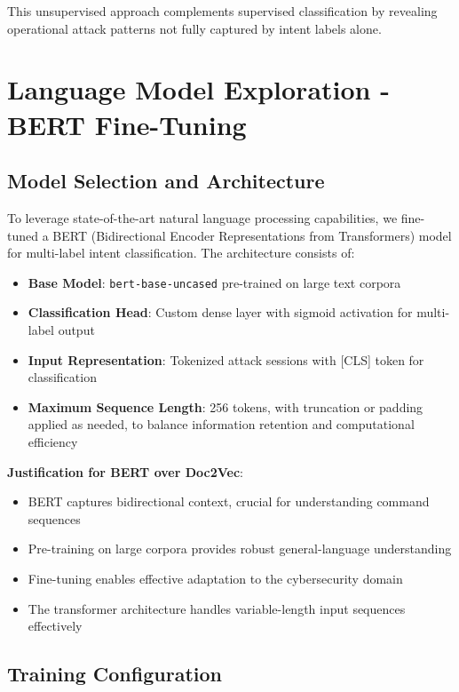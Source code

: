 \documentclass[acmlarge,screen,nonacm]{acmart}
\begin{document}
This unsupervised approach complements supervised classification by revealing operational attack patterns not fully captured by intent labels alone.

\section{Language Model Exploration - BERT Fine-Tuning}

\subsection{Model Selection and Architecture}

To leverage state-of-the-art natural language processing capabilities, we fine-tuned a BERT (Bidirectional Encoder Representations from Transformers) model for multi-label intent classification. The architecture consists of:

\begin{itemize}
    \item \textbf{Base Model}: \texttt{bert-base-uncased} pre-trained on large text corpora
    \item \textbf{Classification Head}: Custom dense layer with sigmoid activation for multi-label output
    \item \textbf{Input Representation}: Tokenized attack sessions with [CLS] token for classification
    \item \textbf{Maximum Sequence Length}: 256 tokens, with truncation or padding applied as needed, to balance information retention and computational efficiency
\end{itemize}

\textbf{Justification for BERT over Doc2Vec}:
\begin{itemize}
    \item BERT captures bidirectional context, crucial for understanding command sequences
    \item Pre-training on large corpora provides robust general-language understanding
    \item Fine-tuning enables effective adaptation to the cybersecurity domain
    \item The transformer architecture handles variable-length input sequences effectively
\end{itemize}

\subsection{Training Configuration}
\end{document}
